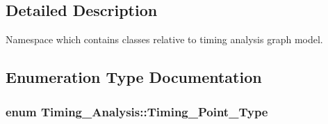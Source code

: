 \subsection{Detailed Description}
Namespace which contains classes relative to timing analysis graph model. 

\subsection{Enumeration Type Documentation}
\hypertarget{namespaceTiming__Analysis_a16a3b48fc06525858e635c3cde4d0ff9}{
\subsubsection[{Timing\-\_\-\-Point\-\_\-\-Type}]{\setlength{\rightskip}{0pt plus 5cm}enum {\bf Timing\-\_\-\-Analysis\-::\-Timing\-\_\-\-Point\-\_\-\-Type}}}\label{namespaceTiming__Analysis_a16a3b48fc06525858e635c3cde4d0ff9}
